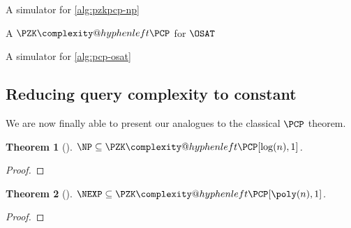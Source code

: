 \documentclass[english,12pt]{reedthesis}
\makeatletter
\theoremstyle{plain}
\newtheorem{thm}{Theorem}[section]
\theoremstyle{definition}
\theoremstyle{remark}
\newcommand{\PZKPCP}{%
  \PZK\complexity@hyphenleft\PCP
}
\makeatother
\begin{document}
\begin{algorithm}[htbp]
  \caption{A simulator for \cref{alg:pzkpcp-np}}\label{alg:pzkpcp-np-sim}
\end{algorithm}

\begin{algorithm}[htbp]
  \caption{A $\PZKPCP$ for $\OSAT$~\cite[Construction 6.4]{GOS25}}\label{alg:pcp-osat}
\end{algorithm}

\begin{algorithm}[htbp]
  \caption{A simulator for \cref{alg:pcp-osat}~\cite[Construction 6.7]{GOS25}}\label{alg:pcp-osat-sim}
\end{algorithm}

\subsection{Reducing query complexity to constant}\label{sec:constant-pcp-np}

We are now finally able to present our analogues to the classical $\PCP$
theorem.

\begin{thm}[{\cite[Theorem 2]{GOS25}}]\label{thm:zk-pcp}
  $\NP \subseteq \PZKPCP[\log(n), 1]$.
\end{thm}

\begin{proof}
\end{proof}

\begin{thm}[{\cite[Theorem 7.1]{GOS25}}]\label{thm:zk-pcp-nexp}
  $\NEXP \subseteq \PZKPCP[\poly(n), 1]$.
\end{thm}

\begin{proof}
\end{proof}
\end{document}
